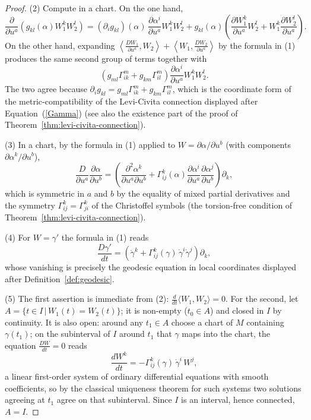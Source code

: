 \begin{proof}
(2) Compute in a chart. On the one hand,
$$\frac{\partial}{\partial u^a}\left(g_{kl}(\alpha)W_1^kW_2^l\right)
=\left(\partial_ig_{kl}\right)(\alpha)\,
\frac{\partial\alpha^i}{\partial u^a}W_1^kW_2^l
+g_{kl}(\alpha)\left(\frac{\partial W_1^k}{\partial u^a}W_2^l
+W_1^k\frac{\partial W_2^l}{\partial u^a}\right).$$
On the other hand, expanding
$\left\langle\frac{DW_1}{\partial u^a},W_2\right\rangle+\left\langle
W_1,\frac{DW_2}{\partial u^a}\right\rangle$ by the formula in (1)
produces the same second group of terms together with
$$\left(g_{ml}\Gamma^m_{ik}+g_{km}\Gamma^m_{il}\right)
\frac{\partial\alpha^i}{\partial u^a}W_1^kW_2^l .$$
The two agree because
$\partial_ig_{kl}=g_{ml}\Gamma^m_{ik}+g_{km}\Gamma^m_{il}$, which is the
coordinate form of the metric-compatibility of the Levi-Civita
connection displayed after Equation~(\ref{Gamma}) (see also the
existence part of the proof of
Theorem~\ref{thm:levi-civita-connection}).

(3) In a chart, by the formula in (1) applied to
$W=\partial\alpha/\partial u^b$ (with components $\partial
\alpha^k/\partial u^b$),
$$\frac{D}{\partial u^a}\frac{\partial\alpha}{\partial u^b}
=\left(\frac{\partial^2\alpha^k}{\partial u^a\partial u^b}
+\Gamma^k_{ij}(\alpha)\frac{\partial\alpha^i}{\partial u^a}
\frac{\partial\alpha^j}{\partial u^b}\right)\partial_k ,$$
which is symmetric in $a$ and $b$ by the equality of mixed partial
derivatives and the symmetry $\Gamma^k_{ij}=\Gamma^k_{ji}$ of the
Christoffel symbols (the torsion-free condition of
Theorem~\ref{thm:levi-civita-connection}).

(4) For $W=\gamma'$ the formula in (1) reads
$$\frac{D\gamma'}{dt}
=\left(\ddot\gamma^k+\Gamma^k_{ij}(\gamma)\,
\dot\gamma^i\dot\gamma^j\right)\partial_k ,$$
whose vanishing is precisely the geodesic equation in local coordinates
displayed after Definition~\ref{def:geodesic}.

(5) The first assertion is immediate from (2):
$\frac{d}{dt}\langle W_1,W_2\rangle=0$. For the second, let $A=\{t\in
I\,|\,W_1(t)=W_2(t)\}$; it is non-empty ($t_0\in A$) and closed in $I$
by continuity. It is also open: around any $t_1\in A$ choose a chart of
$M$ containing $\gamma(t_1)$; on the subinterval of $I$ around $t_1$
that $\gamma$ maps into the chart, the equation $\frac{DW}{dt}=0$ reads
$$\frac{dW^k}{dt}=-\Gamma^k_{ij}(\gamma)\,\dot\gamma^i\,W^j,$$
a linear first-order system of ordinary differential equations with
smooth coefficients, so by the classical uniqueness theorem for such
systems two solutions agreeing at $t_1$ agree on that subinterval.
Since $I$ is an interval, hence connected, $A=I$.
\end{proof}

